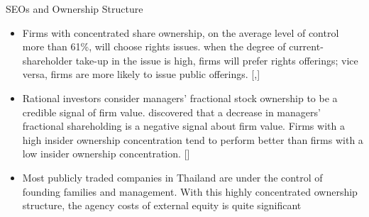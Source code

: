 \documentclass{beamer}
\begin{document}
\begin{frame}{SEOs and Ownership Structure}
	\begin{itemize}\scriptsize
		
		\item  Firms with concentrated share ownership, on the
		average level of control more than 61\%, will choose rights issues. when the degree of current-shareholder take-up in the issue is high,
		firms will prefer rights offerings; vice versa, firms are more likely to issue public
		offerings. [\cite{hansen1982direct},\cite{eckbo1992adverse}]
		\item Rational investors consider managers’ fractional
		stock ownership to be a credible signal of firm value. 
		\cite{leland1977informational}  discovered
		that a decrease in managers’ fractional shareholding is a negative signal about firm
		value. Firms with a high insider ownership concentration
		tend to perform better than firms with a low insider ownership concentration. [\cite{limpaphayom2004ownership}]
		\item Most publicly traded companies in Thailand are under the control of founding families
		and management. With this highly concentrated ownership structure, the agency costs
		of external equity is quite significant
	\end{itemize}
\end{frame}
\end{document}
